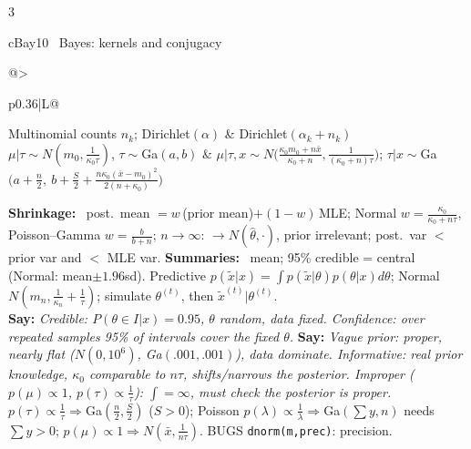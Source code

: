 \documentclass{article}
\newcommand{\h}[1]{{\bfseries #1}\ }
\newcommand{\say}[1]{{\color{cMC!75!black}\textbf{Say:}} \emph{#1}}
\newcommand{\rc}[1]{\texttt{#1}}
\begin{document}
\begin{multicols*}{3}
\begin{tb}{cBay}{10 \textbullet\ Bayes: kernels and conjugacy}
\begin{tabularx}{\linewidth}{@{}>{\raggedright\arraybackslash}p{0.36\linewidth}|L@{}}
Multinomial counts $n_k$; Dirichlet$(\alpha)$ & Dirichlet$(\alpha_k+n_k)$\\
$\mu|\tau\sim N(m_0,\frac1{\kappa_0\tau})$, $\tau\sim$Ga$(a,b)$ & $\mu|\tau,x\sim N\big(\frac{\kappa_0m_0+n\bar x}{\kappa_0+n},\frac1{(\kappa_0+n)\tau}\big)$; $\tau|x\sim$Ga$\big(a+\frac n2,\ b+\frac S2+\frac{n\kappa_0(\bar x-m_0)^2}{2(n+\kappa_0)}\big)$\\
\end{tabularx}
\h{Shrinkage:} post.\ mean $=w\,$(prior mean)$+(1-w)\,$MLE; Normal $w=\frac{\kappa_0}{\kappa_0+n\tau}$, Poisson--Gamma $w=\frac b{b+n}$; $n\to\infty$: $\to N(\hat\theta,\cdot)$, prior irrelevant; post.\ var $<$ prior var and $<$ MLE var.
\h{Summaries:} mean; 95\% credible = central (Normal: mean$\pm1.96$sd). Predictive $p(\tilde x|x)=\int p(\tilde x|\theta)p(\theta|x)d\theta$; Normal $N(m_n,\frac1{\kappa_n}+\frac1\tau)$; simulate $\theta^{(t)}$, then $\tilde x^{(t)}|\theta^{(t)}$.\\
\say{Credible: $P(\theta\in I|x)=0.95$, $\theta$ random, data fixed. Confidence: over repeated samples 95\% of intervals cover the fixed $\theta$.}
\say{Vague prior: proper, nearly flat ($N(0,10^6)$, Ga$(.001,.001)$), data dominate. Informative: real prior knowledge, $\kappa_0$ comparable to $n\tau$, shifts/narrows the posterior. Improper ($p(\mu)\propto1$, $p(\tau)\propto\frac1\tau$): $\int=\infty$, must check the posterior is proper.} $p(\tau)\propto\frac1\tau\Rightarrow$Ga$(\frac n2,\frac S2)$ ($S>0$); Poisson $p(\lambda)\propto\frac1\lambda\Rightarrow$Ga$(\sum y,n)$ needs $\sum y>0$; $p(\mu)\propto1\Rightarrow N(\bar x,\frac1{n\tau})$. BUGS \rc{dnorm(m,prec)}: precision.
\end{tb}


\end{multicols*}
\end{document}
